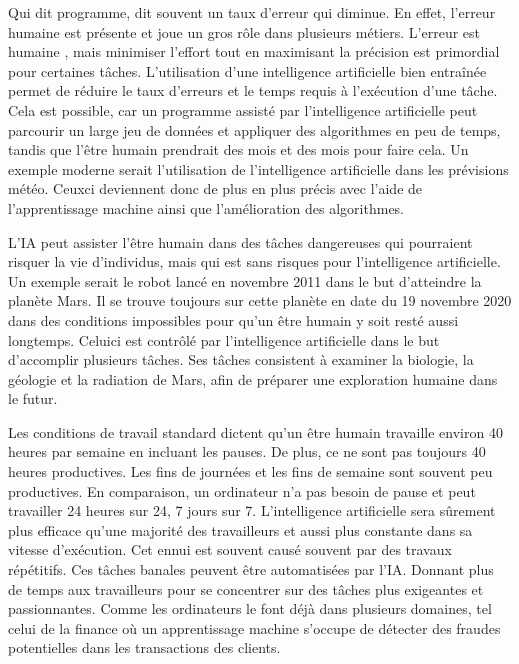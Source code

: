 \documentclass[letterpaper,10pt,french]{sphinxmanual}
\begin{document}
Qui dit programme, dit souvent un taux d’erreur qui diminue. En effet, l’erreur
humaine est présente et joue un gros rôle dans plusieurs métiers. L’erreur est humaine
, mais minimiser l’effort tout en maximisant la précision est primordial pour
certaines tâches. L’utilisation d’une intelligence artificielle bien entraînée
permet de réduire le taux d’erreurs et le temps requis à l’exécution d’une tâche.
Cela est possible, car un programme assisté par l’intelligence artificielle peut
parcourir un large jeu de données et appliquer des algorithmes en peu de temps,
tandis que l’être humain prendrait des mois et des mois pour faire cela. Un exemple
moderne serait l’utilisation de l’intelligence artificielle dans les prévisions météo.
Ceux\sphinxhyphen{}ci deviennent donc de plus en plus précis avec l’aide de l’apprentissage
machine ainsi que l’amélioration des algorithmes.

L’IA peut assister l’être humain dans des tâches dangereuses qui pourraient risquer
la vie d’individus, mais qui est sans risques pour l’intelligence artificielle.
Un exemple serait le robot  lancé en novembre 2011 dans le but d’atteindre
la planète Mars. Il se trouve toujours sur cette planète en date du 19 novembre
2020 dans des conditions impossibles pour qu’un être humain y soit resté aussi
longtemps. Celui\sphinxhyphen{}ci est contrôlé par l’intelligence artificielle dans le but
d’accomplir plusieurs tâches. Ses tâches consistent à examiner la biologie, la
géologie  et la radiation de Mars, afin de préparer une exploration humaine dans le futur.

Les conditions de travail standard dictent qu’un être humain travaille environ
40 heures par semaine en incluant les pauses. De plus, ce ne sont pas toujours
40 heures productives. Les fins de journées et les fins de semaine sont souvent
peu productives. En comparaison, un ordinateur n’a pas besoin de pause et peut
travailler 24 heures sur 24, 7 jours sur 7. L’intelligence artificielle sera
sûrement plus efficace qu’une majorité des travailleurs  et  aussi plus constante
dans sa vitesse d’exécution. Cet ennui est souvent causé souvent par des travaux
répétitifs. Ces tâches banales peuvent être automatisées par l’IA. Donnant plus de
temps aux travailleurs pour se concentrer sur des tâches plus exigeantes et passionnantes.
Comme les ordinateurs le font déjà dans plusieurs domaines, tel celui de la finance
où un apprentissage machine s’occupe de détecter des fraudes potentielles dans
les transactions des clients.
\end{document}
